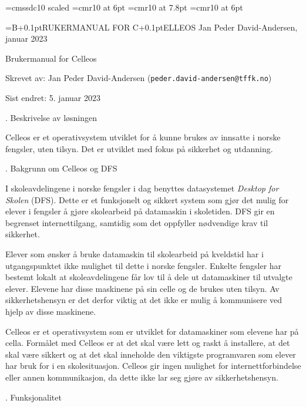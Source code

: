 



\font\ftittel=cmssdc10 scaled
\font\ftopptekst=cmr10 at 6pt
\font\ftopptekststor=cmr10 at 7.8pt
\font\fforfatter=cmr10 at 6pt

\headline={\ftopptekststor B\kern+0.1pt{\ftopptekst RUKERMANUAL FOR } C\kern+0.1pt{\ftopptekst ELLEOS \hfill Jan Peder David-Andersen, januar 2023}}

\topglue 4pc
\centerline{\ftittel Brukermanual for Celleos}
\vskip 5pc


\noindent Skrevet av: Jan Peder David-Andersen ({\tt peder.david-andersen@tffk.no})

\noindent Sist endret: 5. januar 2023

\vskip 6pt

. Beskrivelse av l\o sningen

Celleos er et operativsystem utviklet for \aa{} kunne brukes av innsatte i norske fengsler, uten tilsyn. Det er utviklet med fokus p\aa{} sikkerhet og utdanning.


. Bakgrunn om Celleos og DFS

I skoleavdelingene i norske fengsler i dag benyttes datasystemet {\it Desktop for Skolen} (DFS). Dette er et funksjonelt og sikkert system som gj\o r det mulig for elever i fengsler \aa{} gj\o re skolearbeid p\aa{} datamaskin i skoletiden. DFS gir en begrenset internettilgang, samtidig som det oppfyller n\o dvendige krav til sikkerhet.

Elever som \o nsker \aa{} bruke datamaskin til skolearbeid p\aa{} kveldstid har i utgangspunktet ikke mulighet til dette i norske fengsler. Enkelte fengsler har bestemt lokalt at skoleavdelingene f\aa r lov til \aa{} dele ut datamaskiner til utvalgte elever. Elevene har disse maskinene p\aa{} sin celle og de brukes uten tilsyn. Av sikkerhetshensyn er det derfor viktig at det ikke er mulig \aa{} kommunisere ved hjelp av disse maskinene.

Celleos er et operativsystem som er utviklet for datamaskiner som elevene har p\aa{} cella. Form\aa let med Celleos er at det skal v\ae re lett og raskt \aa{} installere, at det skal v\ae re sikkert og at det skal inneholde den viktigste programvaren som elever har bruk for i en skolesituasjon. Celleos gir ingen mulighet for internettforbindelse eller annen kommunikasjon, da dette ikke lar seg gj\o re av sikkerhetshensyn.

. Funksjonalitet

